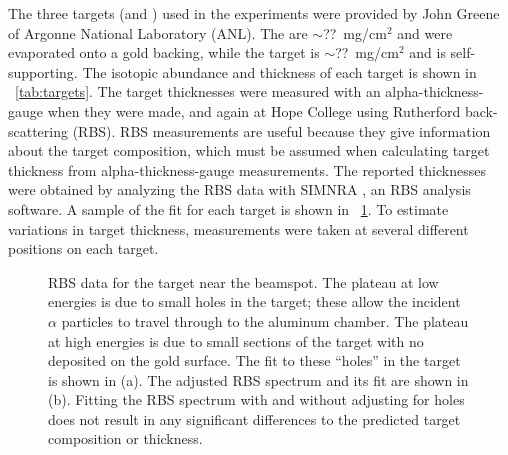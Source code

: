 The three targets (\GeTargets and ) used in the experiments were provided by John Greene of Argonne National Laboratory (ANL).  The \GeTargets are $\sim$??~mg/cm$^2$ and were evaporated onto a gold backing, while the  target is $\sim$??~mg/cm$^2$ and is self-supporting.  The isotopic abundance and thickness of each target is shown in {\tab}~\ref{tab:targets}.  The target thicknesses were measured with an alpha-thickness-gauge when they were made, and again at Hope College using Rutherford back-scattering (RBS).  RBS measurements are useful because they give information about the target composition, which must be assumed when calculating target thickness from alpha-thickness-gauge measurements.  The reported thicknesses were obtained by analyzing the RBS data with SIMNRA \cite{SIMNRA}, an RBS analysis software.  A sample of the fit for each target is shown in {\fig}~\ref{fig:RBS_sample}.  To estimate variations in target thickness, measurements were taken at several different positions on each target.
\begin{figure}[!htbp]
\centering
{}
\caption{RBS data for the  target near the beamspot.  The plateau at low energies is due to small holes in the target; these allow the incident $\alpha$ particles to travel through to the aluminum chamber.  The plateau at high energies is due to small sections of the target with no  deposited on the gold surface.  The fit to these ``holes'' in the target is shown in (a).  The adjusted RBS spectrum and its fit are shown in (b).  Fitting the RBS spectrum with and without adjusting for holes does not result in any significant differences to the predicted target composition or thickness.}
\label{fig:RBS_sample}
\end{figure}
